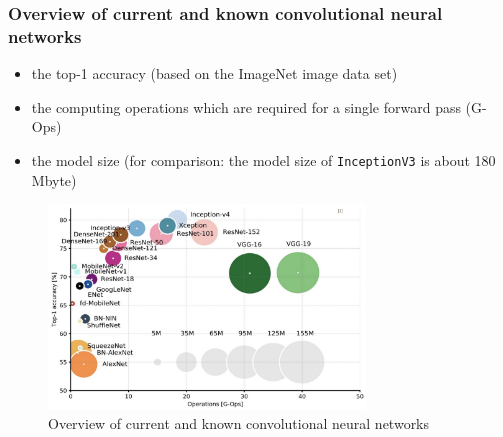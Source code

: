 \documentclass[10pt]{article}
\newif\ifen
\newif\ifde
\newcommand{\en}[1]{\ifen#1\fi}
\newcommand{\de}[1]{\ifde#1\fi}
\begin{document}
				\de{Welchen Vorteil ein vortrainiertes Netzwerk hat, kann man in dieser Arbeit im Kapitel ``\nameref{sec:section_use_of_the_transfer_learning_approach}" einsehen.}
				\en{The advantage of a pre-trained network can be seen in the chapter ``\nameref{sec:section_use_of_the_transfer_learning_approach}" of this thesis.}
			
			\subsubsection{Overview of current and known convolutional neural networks}
				\de{Zu guter Letzt folgen hier noch ein paar aktuelle und bekannte Convolutional Neuronal networks. Sie unterscheiden sich hauptsächlich in folgenden Metriken, wobei in Kombination jedes Netzwerk seine Vor- und Nachteile besitzt:}
				\en{In the following a few current and well-known convolutional neural networks will be presented (Figure \ref{fig:comparison_cnn}). They differ mainly in the following metrics, whereby in combination each network has its advantages and disadvantages:}

				\begin{itemize}
					\setlength\itemsep{0em}
					\item the top-1 accuracy (based on the ImageNet image data set)
					\item the computing operations which are required for a single forward pass (G-Ops)
					\item the model size (for comparison: the model size of \texttt{InceptionV3} is about 180 Mbyte)
				\end{itemize}
		
				\begin{figure}[H]
					\centering
					\includegraphics[width=0.75\textwidth]{images/tl_models}
					\caption[Overview of current and known convolutional neural networks]{Overview of current and known convolutional neural networks\footnotemark}
					\label{fig:comparison_cnn}
				\end{figure}
\end{document}
